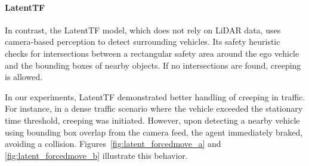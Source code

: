 \paragraph{\textbf{LatentTF}}
In contrast, the LatentTF model, which does not rely on LiDAR data, uses camera-based perception to detect surrounding vehicles. Its safety heuristic checks for intersections between a rectangular safety area around the ego vehicle and the bounding boxes of nearby objects. If no intersections are found, creeping is allowed.

In our experiments, LatentTF demonstrated better handling of creeping in traffic. For instance, in a dense traffic scenario where the vehicle exceeded the stationary time threshold, creeping was initiated. However, upon detecting a nearby vehicle using bounding box overlap from the camera feed, the agent immediately braked, avoiding a collision. Figures~\ref{fig:latent_forcedmove_a} and \ref{fig:latent_forcedmove_b} illustrate this behavior.

